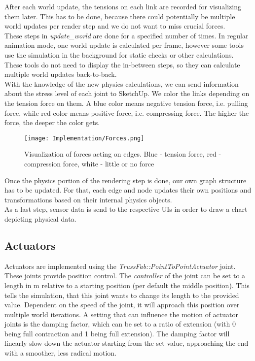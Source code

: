 After each world update, the tensions on each link are recorded for visualizing them later. This has to be done, because there could potentially be multiple world updates per render step and we do not want to miss crucial forces.\\
These steps in \textit{update\_world} are done for a specified number of times. In regular animation mode, one world update is calculated per frame, however some tools use the simulation in the background for static checks or other calculations. These tools do not need to display the in-between steps, so they can calculate multiple world updates back-to-back.\\
With the knowledge of the new physics calculations, we can send information about the stress level of each joint to SketchUp. We color the links depending on the tension force on them. A blue color means negative tension force, i.e. pulling force, while red color means positive force, i.e. compressing force. The higher the force, the deeper the color gets.\\
\begin{figure}[h!]
    \texttt{[image: Implementation/Forces.png]}
    \centering
    \caption{Visualization of forces acting on edges. Blue - tension force, red - compression force, white - little or no force}
    \label{fig:force_visualization}
\end{figure}
Once the physics portion of the rendering step is done, our own graph structure has to be updated. For that, each edge and node updates their own positions and transformations based on their internal physics objects.\\
As a last step, sensor data is send to the respective UIs in order to draw a chart depicting physical data.

\subsection{Actuators}
Actuators are implemented using the \textit{TrussFab::PointToPointActuator} joint. These joints provide position control. The \textit{controller} of the joint can be set to a length in m relative to a starting position (per default the middle position). This tells the simulation, that this joint wants to change its length to the provided value. Dependent on the speed of the joint, it will approach this position over multiple world iterations. A setting that can influence the motion of actuator joints is the damping factor, which can be set to a ratio of extension (with 0 being full contraction and 1 being full extension). The damping factor will linearly slow down the actuator starting from the set value, approaching the end with a smoother, less radical motion.

